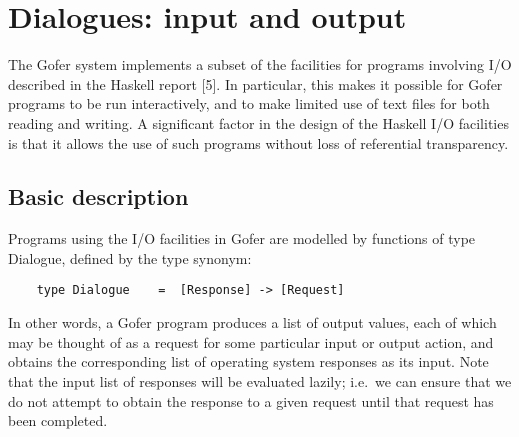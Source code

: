 \chapter{Dialogues: input and output}

The Gofer system implements a subset of  the  facilities  for  programs
involving I/O described in the Haskell report [5].  In particular, this
makes it possible for Gofer programs to be run  interactively,  and  to
make limited use of  text  files  for  both  reading  and  writing.   A
significant factor in the design of the Haskell I/O facilities is  that
it allows  the  use  of  such  programs  without  loss  of  referential
transparency.

\section{Basic description}
Programs using the I/O facilities in Gofer are modelled by functions of
type Dialogue, defined by the type synonym:
\begin{verbatim}
    type Dialogue    =  [Response] -> [Request]
\end{verbatim}
In other words, a Gofer program produces a list of output values,  each
of which may be thought of as a request for some  particular  input  or
output action, and obtains the corresponding list of  operating  system
responses as its input.  Note that the input list of responses will  be
evaluated lazily; i.e.\ we can ensure that we do not attempt  to  obtain
the response to a given request until that request has been completed.

